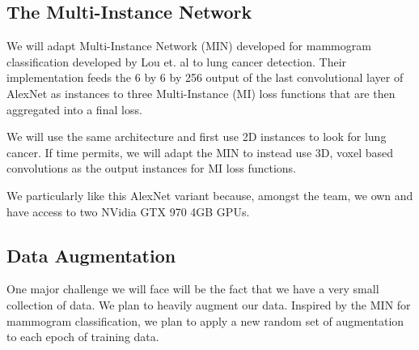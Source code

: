 \documentclass[twocolumn,10pt]{article}
\begin{document}

\subsection{The Multi-Instance Network}

We will adapt Multi-Instance Network (MIN) developed for mammogram classification developed by
Lou et. al \cite{Maron:1998:FML:302528.302753} to lung cancer detection. 
Their implementation feeds the 6 by 6 by 256 output of the last
convolutional layer of AlexNet as instances to three Multi-Instance (MI) loss functions 
that are then aggregated into a final loss.

We will use the same architecture and first use 2D instances to look for 
lung cancer. If time permits, we will adapt the MIN to instead use 3D, voxel
based convolutions as the output instances for MI loss functions. 

We particularly like this AlexNet variant because, amongst the team, we own and 
have access to two NVidia GTX 970 4GB GPUs.

\subsection{Data Augmentation}

One major challenge we will face will be the fact that we have a very small 
collection of data. We plan to heavily augment our data. Inspired by the MIN
for mammogram classification, we plan to apply a new random set of augmentation
to each epoch of training data.
\end{document}
